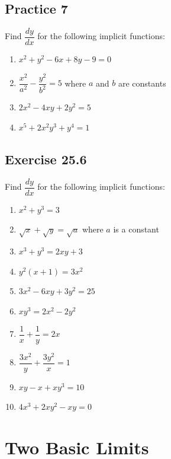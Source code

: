 \documentclass[12pt]{report}
\begin{document}
\subsection{Practice 7}

\noindent Find $\dfrac{dy}{dx}$ for the following implicit functions:
\setlength{\columnseprule}{1pt}
\setlength{\columnsep}{24pt}
\begin{multicols}{2}
  \begin{enumerate}
    \item $x^{2}+y^{2}-6x+8y-9=0$
    \item ${\dfrac{x^{2}}{a^{2}}}-{\dfrac{y^{2}}{b^{2}}}=5$ where $a$ and $b$ are constants
    \item $2x^{2}-4x y+2y^{2}=5$
    \item $x^{5}+2x^{2}y^{3}+y^{4}=1$
  \end{enumerate}
\end{multicols}

\subsection{Exercise 25.6}

\noindent Find $\dfrac{dy}{dx}$ for the following implicit functions:
\setlength{\columnseprule}{1pt}
\setlength{\columnsep}{24pt}
\begin{multicols}{2}
  \begin{enumerate}
    \item $x^{2}+y^{3}=3$
    \item ${\sqrt{x}}+{\sqrt{y}}={\sqrt{a}}$ where $a$ is a constant
    \item $x^{3}+y^{3}=2x y+3$
    \item $y^{2}(x+1)=3x^{2}$
    \item $3x^{2}-6x y+3y^{2}=25$
    \item $x y^{3}=2x^{2}-2y^{2}$
    \item ${\dfrac{1}{x}}+{\dfrac{1}{y}}=2x$
    \item ${\dfrac{3x^{2}}{y}}+{\dfrac{3y^{2}}{x}}=1$
    \item $xy-x+xy^{3}=10$
    \item ${4x^{3}}+2x y^{2}-x y=0$
  \end{enumerate}
\end{multicols}

\section{Two Basic Limits}
\end{document}
